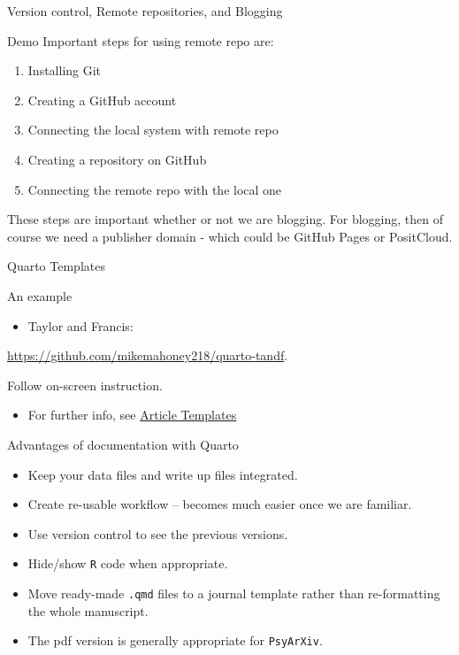 \documentclass[
  ignorenonframetext,
  aspectratio=169,
]{beamer}
\providecommand{\tightlist}{%
  \setlength{\itemsep}{0pt}\setlength{\parskip}{0pt}}\usepackage{longtable,booktabs,array}
\begin{document}
\begin{frame}[fragile]{Version control, Remote repositories, and
Blogging}
\begin{block}{Demo}
\label{demo}
Important steps for using remote repo are:

\begin{enumerate}
\tightlist
\item
  Installing Git
\item
  Creating a GitHub account
\item
  Connecting the local system with remote repo
\item
  Creating a repository on GitHub
\item
  Connecting the remote repo with the local one
\end{enumerate}

These steps are important whether or not we are blogging. For blogging,
then of course we need a publisher domain - which could be GitHub Pages
or PositCloud.
\end{block}
\end{frame}

\begin{frame}[fragile]{Quarto Templates}
\label{quarto-templates}
\begin{block}{An example}
\label{an-example}
\begin{itemize}
\tightlist
\item
  Taylor and Francis:
\end{itemize}

\url{https://github.com/mikemahoney218/quarto-tandf}.

Follow on-screen instruction.

\begin{itemize}
\tightlist
\item
  For further info, see
  \href{https://quarto.org/docs/journals/templates.html}{Article
  Templates}
\end{itemize}
\end{block}

\begin{block}{Advantages of documentation with Quarto}
\label{advantages-of-documentation-with-quarto}
\begin{itemize}
\tightlist
\item
  Keep your data files and write up files integrated.
\item
  Create re-usable workflow -- becomes much easier once we are familiar.
\item
  Use version control to see the previous versions.
\item
  Hide/show \texttt{R} code when appropriate.
\item
  Move ready-made \texttt{.qmd} files to a journal template rather than
  re-formatting the whole manuscript.
\item
  The pdf version is generally appropriate for \texttt{PsyArXiv}.
\end{itemize}
\end{block}
\end{frame}
\end{document}
